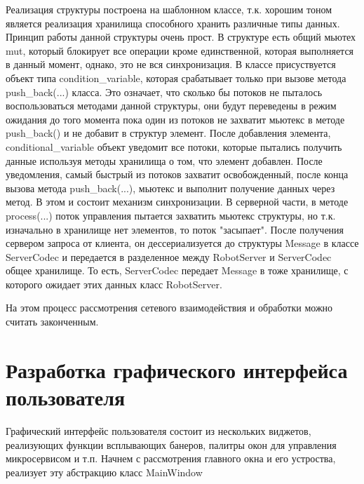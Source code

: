 \documentclass[a4paper, 14pt]{extreport}
\begin{document}
\par Реализация структуры построена на шаблонном классе, т.к. хорошим тоном является реализация хранилища способного хранить различные 
типы данных. Принцип работы данной структуры очень прост. В структуре есть общий мьютех mut, который блокирует все операции кроме 
единственной, которая выполняется в данный момент, однако, это не вся синхронизация. В классе присуствуется объект типа 
condition\_variable, которая срабатывает только при вызове метода push\_back(...) класса. Это означает, что сколько бы потоков не 
пыталось воспользоваться методами данной структуры, они будут переведены в режим ожидания  до того момента пока один из потоков
не захватит мьютекс в методе push\_back() и не добавит в структур элемент. После добавления элемента, conditional\_variable объект 
уведомит все потоки, которые пытались получить данные используя методы хранилища о том, что элемент добавлен. После уведомления, 
самый быстрый из потоков захватит освобожденный, после конца вызова метода push\_back(...), мьютекс и выполнит получение данных через 
метод. В этом и состоит механизм синхронизации. В серверной части, в методе process(...) поток управления пытается захватить мьютекс 
структуры, но т.к. изначально в хранилище нет элементов, то поток "засыпает". После получения сервером запроса от клиента, он 
дессериализуется до структуры Message в классе ServerCodec и передается в разделенное между RobotServer и ServerCodec общее хранилище.
То есть, ServerCodec передает Message в тоже хранилище, с которого ожидает этих данных класс RobotServer. 
\par На этом процесс рассмотрения сетевого взаимодействия и обработки можно считать законченным.
\section{Разработка графического интерфейса пользователя}
\par Графический интерфейс пользователя состоит из нескольких виджетов, реализующих функции всплывающих банеров, палитры окон для 
управления микросервисом и т.п. Начнем с рассмотрения главного окна и его устроства, реализует эту абстракцию класс MainWindow
\end{document}
